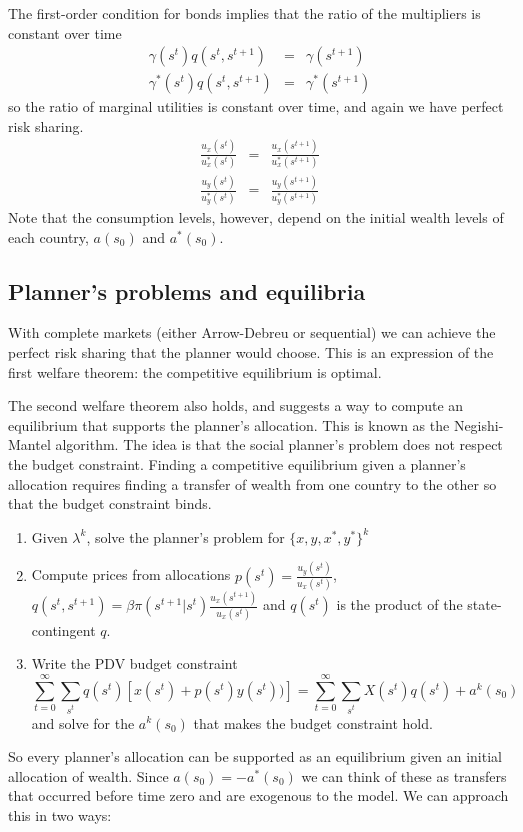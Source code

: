 \documentclass[11pt,pdftex,twoside,letterpaper]{exam}
\begin{document}
The first-order condition for bonds implies that the ratio of the multipliers is constant over time
\begin{eqnarray}
  \gamma(s^t)q(s^t,s^{t+1}) &=& \gamma(s^{t+1})\\
  \gamma^*(s^t)q(s^t,s^{t+1}) &=& \gamma^*(s^{t+1})
\end{eqnarray}
so the ratio of marginal utilities is constant over time, and again we have perfect risk sharing.
\begin{eqnarray}
  \frac{u_x(s^t)}{u_x^*(s^t)} &=& \frac{u_x(s^{t+1})}{u_x^*(s^{t+1})}\\
  \frac{u_y(s^t)}{u_y^*(s^t)} &=& \frac{u_y(s^{t+1})}{u_y^*(s^{t+1})}
\end{eqnarray}
Note that the consumption levels, however, depend on the initial wealth levels of each country, $a(s_0)$ and $a^*(s_0)$.

\subsection{Planner's problems and equilibria}
With complete markets (either Arrow-Debreu or sequential) we can achieve the perfect risk sharing that the planner would choose. This is an expression of the first welfare theorem: the competitive equilibrium is optimal.

The second welfare theorem also holds, and suggests a way to compute an equilibrium that supports the planner's allocation. This is known as the Negishi-Mantel algorithm. The idea is that the social planner's problem does not respect the budget constraint. Finding a competitive equilibrium given a planner's allocation requires finding a transfer of wealth from one country to the other so that the budget constraint binds.

\begin{enumerate}
  \item Given $\lambda^k$, solve the planner's problem for $\{x,y,x^*,y^*\}^k$
  \item Compute prices from allocations $p(s^t)=\frac{u_y(s^t)}{u_x(s^t)}$, $q(s^t,s^{t+1})=\beta \pi(s^{t+1}|s^t)\frac{u_x(s^{t+1})}{u_x(s^t)}$ and $q(s^t)$ is the product of the state-contingent $q$.
  \item Write the PDV budget constraint
  \[
  \sum_{t=0}^\infty\sum_{s^t} q(s^t)[x(s^t) + p(s^t)y(s^t))] = \sum_{t=0}^\infty\sum_{s^t} X(s^t)q(s^t) + a^k(s_0)
  \]
  and solve for the $a^k(s_0)$ that makes the budget constraint hold.
\end{enumerate}
So every planner's allocation can be supported as an equilibrium given an initial allocation of wealth. Since $a(s_0)=-a^*(s_0)$ we can think of these as transfers that occurred before time zero and are exogenous to the model. We can approach this in two ways:
\end{document}
